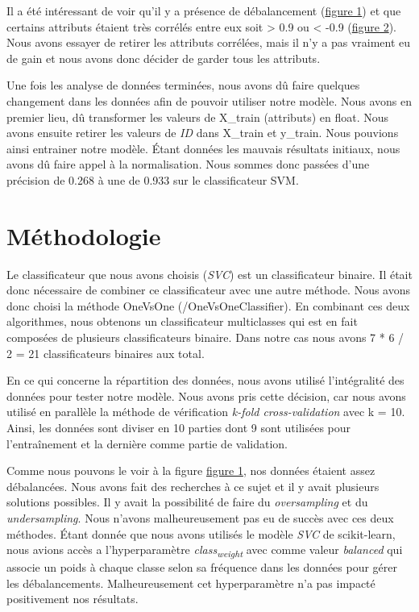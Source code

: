 \documentclass[12pt]{extarticle}
\begin{document}
\vspace{5mm}

Il a été intéressant de voir qu'il y a présence de débalancement (\hyperref[fig:barchart]{figure 1}) et que certains attributs étaient très corrélés entre eux soit > 0.9 ou < -0.9 (\hyperref[fig:heatmap]{figure 2}). Nous avons essayer de retirer les attributs corrélées, mais il n'y a pas vraiment eu de gain et nous avons donc décider de garder tous les attributs.

Une fois les analyse de données terminées, nous avons dû faire quelques changement dans les données afin de pouvoir utiliser notre modèle. Nous avons en premier lieu, dû transformer les valeurs de X\_train (attributs) en float. Nous avons ensuite retirer les valeurs de \emph{ID} dans X\_train et y\_train. Nous pouvions ainsi entrainer notre modèle. Étant données les mauvais résultats initiaux, nous avons dû faire appel à la normalisation. Nous sommes donc passées d'une précision de 0.268 à une de 0.933 sur le classificateur SVM.

\section{Méthodologie}
\label{sec:org035eddf}
Le classificateur que nous avons choisis (\emph{SVC}) est un classificateur binaire. Il était donc nécessaire de combiner ce classificateur avec une autre méthode. Nous avons donc choisi la méthode OneVsOne (/OneVsOneClassifier). En combinant ces deux algorithmes, nous obtenons un classificateur multiclasses qui est en fait composées de plusieurs classificateurs binaire. Dans notre cas nous avons 7 * 6 / 2 = 21 classificateurs binaires aux total.

En ce qui concerne la répartition des données, nous avons utilisé l'intégralité des données pour tester notre modèle. Nous avons pris cette décision, car nous avons utilisé en parallèle la méthode de vérification \emph{k-fold cross-validation} avec k = 10. Ainsi, les données sont diviser en 10 parties dont 9 sont utilisées pour l'entraînement et la dernière comme partie de validation.

Comme nous pouvons le voir à la figure \hyperref[fig:barchart]{figure 1}, nos données étaient assez débalancées. Nous avons fait des recherches à ce sujet et il y avait plusieurs solutions possibles. Il y avait la possibilité de faire du \emph{oversampling} et du \emph{undersampling}. Nous n'avons malheureusement pas eu de succès avec ces deux méthodes. Étant donnée que nous avons utilisés le modèle \emph{SVC} de scikit-learn, nous avions accès a l'hyperparamètre \emph{class\textsubscript{weight}} avec comme valeur \emph{balanced} qui associe un poids à chaque classe selon sa fréquence dans les données pour gérer les débalancements. Malheureusement cet hyperparamètre n'a pas impacté positivement nos résultats.
\end{document}
